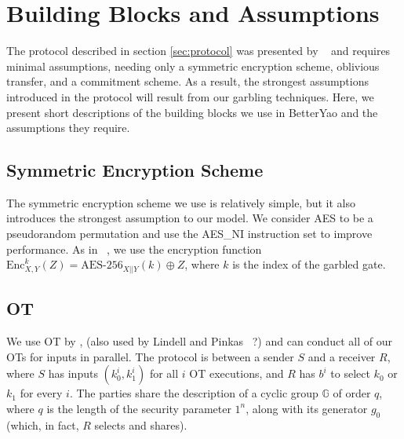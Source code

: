 \documentclass{article}
\begin{document}
\section{Building Blocks and Assumptions} \label{sec:building-blocks-assumptions}
The protocol described in section \ref{sec:protocol} was presented by ~\cite{fast2pc} and requires minimal assumptions, needing only a symmetric encryption scheme, oblivious transfer, and a commitment scheme. As a result, the strongest assumptions introduced in the protocol will result from our garbling techniques. Here, we present short descriptions of the building blocks we use in BetterYao and the assumptions they require.

\subsection{Symmetric Encryption Scheme}\label{sec:symmetric-enc-scheme}
The symmetric encryption scheme we use is relatively simple, but it also introduces the strongest assumption to our model. We consider AES to be a pseudorandom permutation and use the AES\_NI instruction set to improve performance. As in ~\cite{billiongate}, we use the encryption function $\text{Enc}_{X,Y}^{k}(Z) = \text{AES-256}_{X||Y}(k) \oplus Z$, where $k$ is the index of the garbled gate.

\subsection{OT}
We use OT by \cite{?} , (also used by Lindell and Pinkas ~\cite{LP-2PC-OT}?) %
and can conduct all of our OTs for inputs in parallel. The protocol is between a sender $S$ and a receiver $R$, where $S$ has inputs $(k_{0}^{i}, k_{1}^{i})$ for all $i$ OT executions, and $R$ has $b^{i}$ to select $k_{0}$ or $k_{1}$ for every $i$. The parties share the description of a cyclic group $\mathbb{G}$ of order $q$, where $q$ is the length of the security parameter $1^{n}$, along with its generator $g_{0}$ (which, in fact, $R$ selects and shares). 
\end{document}

